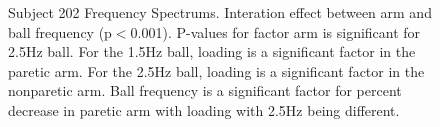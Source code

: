 \documentclass{article}
\begin{document}
\begin{figure}[!ht]
     \centering
     \hfill
     \hfill
	\caption{Subject 202 Frequency Spectrums. Interation effect between arm and ball frequency (p$<$0.001). P-values for factor arm is significant for 2.5Hz ball. For the 1.5Hz ball, loading is a significant factor in the paretic arm. For the 2.5Hz ball, loading is a significant factor in the nonparetic arm. Ball frequency is a significant factor for percent decrease in paretic arm with loading  with 2.5Hz being different.}
\end{figure}
\end{document}
